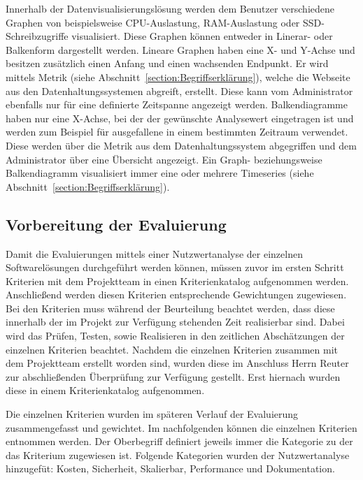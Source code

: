 Innerhalb der Datenvisualisierungslösung werden dem Benutzer verschiedene
Graphen von beispielsweise CPU\hyp{}Auslastung, RAM\hyp{}Auslastung oder
\gls{SSD}\hyp{}Schreibzugriffe visualisiert. Diese Graphen können entweder in
Linerar\hyp{} oder Balkenform dargestellt werden. Lineare Graphen haben eine
X\hyp{} und Y\hyp{}Achse und besitzen zusätzlich einen Anfang und einen
wachsenden Endpunkt. Er wird mittels Metrik (siehe
Abschnitt~\ref{section:Begriffserklärung}), welche die Webseite aus den
Datenhaltungssystemen abgreift, erstellt. Diese kann vom Administrator
ebenfalls nur für eine definierte Zeitspanne angezeigt werden. Balkendiagramme
haben nur eine X\hyp{}Achse, bei der der gewünschte Analysewert eingetragen ist
und werden zum Beispiel für ausgefallene  in einem
bestimmten Zeitraum verwendet. Diese werden über die Metrik aus dem
Datenhaltungssystem abgegriffen und dem Administrator über eine Übersicht
angezeigt. Ein Graph\hyp{} beziehungsweise Balkendiagramm visualisiert immer
eine oder mehrere Timeseries (siehe Abschnitt~\ref{section:Begriffserklärung}).

\subsection{Vorbereitung der Evaluierung}
\label{subsec:vorbereiten_der_evaluierung_datenvisualisierung}
Damit die Evaluierungen mittels einer Nutzwertanalyse der einzelnen
Softwarelösungen durchgeführt werden können, müssen zuvor im ersten Schritt
Kriterien mit dem Projektteam in einen Kriterienkatalog aufgenommen werden.
Anschließend werden diesen Kriterien entsprechende Gewichtungen zugewiesen. Bei
den Kriterien muss während der Beurteilung beachtet werden, dass diese
innerhalb der im Projekt zur Verfügung stehenden Zeit realisierbar sind. Dabei
wird das Prüfen, Testen, sowie Realisieren in den zeitlichen Abschätzungen der
einzelnen Kriterien beachtet. Nachdem die einzelnen Kriterien zusammen mit dem
Projektteam erstellt worden sind, wurden diese im Anschluss Herrn Reuter zur
abschließenden Überprüfung zur Verfügung gestellt. Erst hiernach wurden diese
in einem Kriterienkatalog aufgenommen.

Die einzelnen Kriterien wurden im späteren Verlauf der Evaluierung
zusammengefasst und gewichtet. Im nachfolgenden können die einzelnen Kriterien
entnommen werden. Der Oberbegriff definiert jeweils immer die Kategorie zu der
das Kriterium zugewiesen ist. Folgende Kategorien wurden der Nutzwertanalyse
hinzugefüt: Kosten, Sicherheit, Skalierbar, Performance und Dokumentation.

